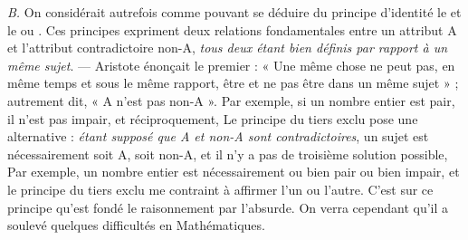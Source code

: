 {\it B.} On considérait autrefois comme pouvant se déduire du principe
d’identité le  et le  ou . Ces principes expriment deux relations
fondamentales entre un attribut A et l’attribut contradictoire non-A,
{\it tous deux étant bien définis par rapport à un même sujet}. — Aristote
énonçait le premier : « Une même chose ne peut pas, en même temps
et sous le même rapport, être et ne pas être dans un même sujet » ;
autrement dit, « A n’est pas non-A ». Par exemple, si un nombre
entier est pair, il n’est pas impair, et réciproquement, Le principe du
tiers exclu pose une alternative : {\it étant supposé que A et non-A sont
contradictoires}, un sujet est nécessairement soit A, soit non-A, et il
n'y a pas de troisième solution possible, Par exemple, un nombre
entier est nécessairement ou bien pair ou bien impair, et le principe du
tiers exclu me contraint à affirmer l’un ou l’autre. C’est sur ce principe qu'est fondé le raisonnement par l’absurde. On verra cependant
qu'il a soulevé quelques difficultés en Mathématiques.

